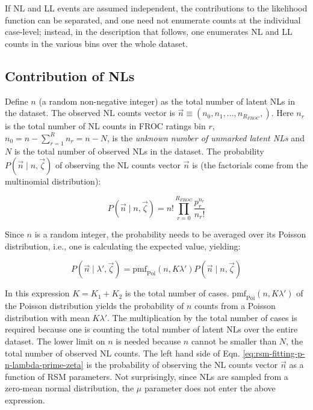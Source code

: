 \documentclass[
]{book}
\begin{document}
If NL and LL events are assumed independent, the contributions to the likelihood function can be separated, and one need not enumerate counts at the individual case-level; instead, in the description that follows, one enumerates NL and LL counts in the various bins over the whole dataset.

\hypertarget{rsm-fitting-froc-nls}{%
\subsection{Contribution of NLs}\label{rsm-fitting-froc-nls}}

Define \(n\) (a random non-negative integer) as the total number of latent NLs in the dataset. The observed NL counts vector is \(\overrightarrow{n} \equiv \left ( n_0, n_1, ...,n_{R_{FROC}}, \right )\). Here \(n_r\) is the total number of NL counts in FROC ratings bin \(r\), \(n_0 = n - \sum_{r=1}^{R} n_r = n - N\), is the \emph{unknown number of unmarked latent NLs} and \(N\) is the total number of observed NLs in the dataset. The probability \(P\left ( \overrightarrow{n} \mid n, \overrightarrow{\zeta} \right )\) of observing the NL counts vector \(\overrightarrow{n}\) is (the factorials come from the multinomial distribution):

\begin{equation}
P\left ( \overrightarrow{n} \mid n, \overrightarrow{\zeta} \right ) = n! \prod_{r=0}^{R_{FROC}} \frac{p_r^{n_r}}{n_r!}
\label{eq:rsm-fitting-pnvector}
\end{equation}

Since \(n\) is a random integer, the probability needs to be averaged over its Poisson distribution, i.e., one is calculating the expected value, yielding:

\begin{equation}
P\left ( \overrightarrow{n} \mid \lambda', \overrightarrow{\zeta} \right ) = \text{pmf}_{\text{Poi}} \left ( n, K\lambda' \right ) P\left ( \overrightarrow{n} \mid n, \overrightarrow{\zeta} \right )
\label{eq:rsm-fitting-p-n-lambda-prime-zeta}
\end{equation}

In this expression \(K = K_1 + K_2\) is the total number of cases. \(\text{pmf}_{\text{Poi}} \left ( n, K\lambda' \right )\) of the Poisson distribution yields the probability of \(n\) counts from a Poisson distribution with mean \(K\lambda'\). The multiplication by the total number of cases is required because one is counting the total number of latent NLs over the entire dataset. The lower limit on \(n\) is needed because \(n\) cannot be smaller than \(N\), the total number of observed NL counts. The left hand side of Eqn. \eqref{eq:rsm-fitting-p-n-lambda-prime-zeta} is the probability of observing the NL counts vector \(\overrightarrow{n}\) as a function of RSM parameters. Not surprisingly, since NLs are sampled from a zero-mean normal distribution, the \(\mu\) parameter does not enter the above expression.
\end{document}
